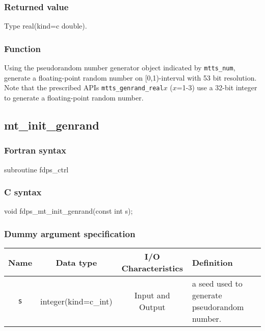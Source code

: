 \subsubsection*{Returned value}
Type real(kind=c double).

\subsubsection*{Function}
Using the pseudorandom number generator object indicated by \texttt{mtts\_num}, generate a floating-point random number on [0,1)-interval with 53 bit resolution. Note that the prescribed APIs \texttt{mtts\_genrand\_real}$x$ ($x$=1-3) use a 32-bit integer to generate a floating-point random number.
\clearpage

\subsection{mt\_init\_genrand}
\subsubsection*{Fortran syntax}
\begin{screen}
\begin{spverbatim}
subroutine fdps_ctrl%
\end{spverbatim}
\end{screen}

\subsubsection*{C syntax}
\begin{screen}
\begin{spverbatim}
void fdps_mt_init_genrand(const int s);
\end{spverbatim}
\end{screen}

\subsubsection*{Dummy argument specification}
\begin{table}[h]
\begin{tabularx}{\linewidth}{cccX}
\toprule
\rowcolor{Snow2}
Name & Data type & I/O Characteristics & Definition \\
\midrule
\texttt{s} & integer(kind=c\_int) & Input and Output & a seed used to generate pseudorandom number. \\
\bottomrule
\end{tabularx}
\end{table}


